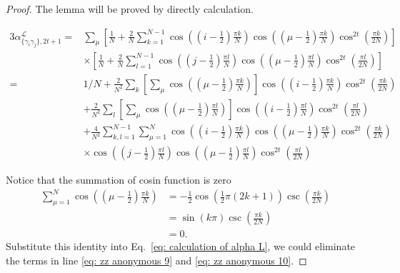 \documentclass{article}
\newcommand{\alpl}{\alpha_{\{\gamma_i\gamma_j\}, 2t+1}^{\mathscr{L}}}
\begin{document}
\begin{proof}
    The lemma will be proved by directly calculation.

\begin{align}
    3\alpl =& \sum_\mu \left[ \frac{1}{N} + \frac{2}{N} \sum_{k=1}^{N-1} \cos \left(\left(i-\frac{1}{2}\right) \frac{\pi k}{N}\right) \cos \left(\left(\mu-\frac{1}{2}\right) \frac{\pi k}{N}\right) \cos ^{2 t} \left( \frac{\pi k}{2 N} \right)\right] \nonumber\\
     &\times\left[ \frac{1}{N} + \frac{2}{N} \sum_{l=1}^{N-1} \cos \left(\left(j-\frac{1}{2}\right) \frac{\pi l}{N}\right) \cos \left(\left(\mu-\frac{1}{2}\right) \frac{\pi l}{N}\right) \cos ^{2 t}\left( \frac{\pi l}{2 N} \right)  \right] \nonumber\\
     =& 1/N + \frac{2}{N^2} \sum_k \left[\sum_\mu \cos\left(\left(\mu-\frac{1}{2}\right) \frac{\pi k}{N}\right)  \right] 
     \cos \left(\left(i-\frac{1}{2}\right) \frac{\pi k}{N}\right) \cos ^{2 t} \left( \frac{\pi k}{2 N} \right) 
     \label{eq: zz anonymous 9}
     \\
     &+ \frac{2}{N^2} \sum_l \left[\sum_\mu \cos\left(\left(\mu-\frac{1}{2}\right) \frac{\pi l}{N}\right)  \right] 
     \cos \left(\left(i-\frac{1}{2}\right) \frac{\pi l}{N}\right) \cos ^{2 t} \left( \frac{\pi l}{2 N} \right) 
     \label{eq: zz anonymous 10}
     \\
     &+ \frac{4}{N^2} \sum_{k,l =1}^{N-1} \sum_{\mu = 1}^{N} \cos \left(\left(i-\frac{1}{2}\right) \frac{\pi k}{N}\right) \cos \left(\left(\mu-\frac{1}{2}\right) \frac{\pi k}{N}\right) \cos ^{2 t} \left( \frac{\pi k}{2 N} \right)  \nonumber\\
     &\times \cos \left(\left(j-\frac{1}{2}\right) \frac{\pi l}{N}\right) \cos \left(\left(\mu-\frac{1}{2}\right) \frac{\pi l}{N}\right) \cos ^{2 t}\left( \frac{\pi l}{2 N} \right)  
     \label{eq: calculation of alpha L}
\end{align}

Notice that the summation of cosin function is zero 
\begin{equation}
\begin{aligned}
\sum_{\mu=1}^{N} \cos\left(\left(\mu-\frac{1}{2}\right) \frac{\pi k}{N}\right)& =-\frac{1}{2} \cos \left(\frac{1}{2} \pi(2 k+1)\right) \csc \left(\frac{\pi k}{2 N}\right) \\
& =\sin (k \pi) \csc \left(\frac{\pi k}{2 N}\right) \\
& =0.
\end{aligned}
\end{equation}
Substitute this identity into Eq.~\eqref{eq: calculation of alpha L}, we could eliminate the terms in line \eqref{eq: zz anonymous 9} and \eqref{eq: zz anonymous 10}. 


\end{proof}
\end{document}
